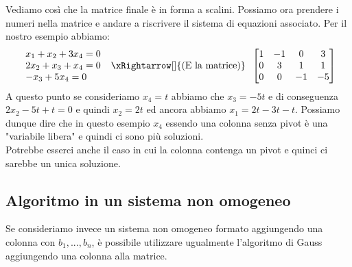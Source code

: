 \noindent Vediamo così che la matrice finale è in forma a scalini. Possiamo ora prendere i numeri nella matrice e andare a riscrivere il sistema di equazioni associato. Per il nostro esempio abbiamo:
\[
\begin{array}{l}
x_1 + x_2 + 3x_4 = 0\\
2x_2 + x_3 + x_4 = 0\\
-x_3 + 5x_4 = 0
\end{array}
\hspace{.2cm}
\xRightarrow[]{\text{(E la matrice)}}
\hspace{.2cm}
\begin{bmatrix}
1 & -1 & 0 & 3\\
0 & 3 & 1 & 1\\
0 & 0 & -1 & -5
\end{bmatrix}
\]
A questo punto se consideriamo $x_4 = t$ abbiamo che $x_3 = -5t$ e di conseguenza $2x_2 - 5t + t = 0$ e quindi $x_2 = 2t$ ed ancora abbiamo $x_1 = 2t -3t -t$. Possiamo dunque dire che in questo esempio $x_4$ essendo una colonna senza pivot è una "variabile libera" e quindi ci sono più soluzioni.\\
Potrebbe esserci anche il caso in cui la colonna contenga un pivot e quinci ci sarebbe un unica soluzione.

\subsection{Algoritmo in un sistema non omogeneo}
Se consideriamo invece un sistema non omogeneo formato aggiungendo una colonna con $b_1, ..., b_n$, è possibile utilizzare ugualmente l'algoritmo di Gauss aggiungendo una colonna alla matrice.


